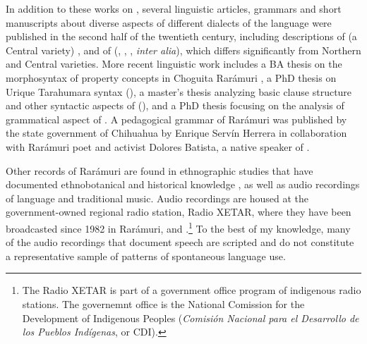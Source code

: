 In addition to these works on , several linguistic articles, grammars and short manuscripts about diverse aspects of different dialects of the language were published in the second half of the twentieth century, including descriptions of  (a Central variety) \citep{hilton1993diccionario}, and of  (\citealt{burgess1970tarahumara}, \citealt{Burgess-1984}, \citealt{burgess2001como}, \textit{inter alia}), which differs significantly from Northern and Central varieties. More recent linguistic work includes a BA thesis on the morphosyntax of property concepts in Choguita Rarámuri \citep{islas2010caracterizacion}, a PhD thesis on Urique Tarahumara syntax (\citealt{jara2013predication}), a master’s thesis analyzing basic clause structure and other syntactic aspects of  (\citealt{moralesmoreno2016rochecahi}), and a PhD thesis focusing on the analysis of grammatical aspect of  \citep{villalpando2019grammatical}. A pedagogical grammar of Rarámuri was published by the state government of Chihuahua by Enrique Servín Herrera in collaboration with Rarámuri poet and activist Dolores Batista, a native speaker of  \citep{servin2002ralamuli}.

Other records of Rarámuri are found in ethnographic studies that have documented ethnobotanical and historical knowledge \citep{bennett1935tarahumara,bye1975ethnobotany,bye1976ethnoecology,merrill1988raramuri,pintado2012hijos}, as well as audio recordings of language and traditional music. Audio recordings are housed at the government-owned regional radio station, Radio XETAR, where they have been broadcasted since 1982 in Rarámuri,  and .\footnote{The Radio XETAR is part of a government office program of indigenous radio stations. The governemnt office is the National Comission for the Development of Indigenous Peoples (\textit{Comisión Nacional para el Desarrollo de los Pueblos Indígenas}, or CDI).} To the best of my knowledge, many of the audio recordings that document speech are scripted and do not constitute a representative sample of patterns of spontaneous language use.



